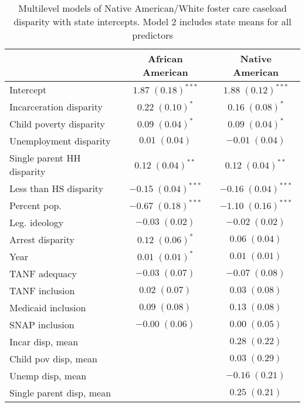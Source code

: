 
\begin{table}
\caption{Multilevel models of Native American/White foster care caseload disparity with state intercepts. Model 2 includes state means for all predictors }
\begin{center}
\begin{tabular}{l c c }
\hline
 & African American & Native American \\
\hline
Intercept                  & $1.87 \; (0.18)^{***}$  & $1.88 \; (0.12)^{***}$  \\
Incarceration disparity    & $0.22 \; (0.10)^{*}$    & $0.16 \; (0.08)^{*}$    \\
Child poverty disparity    & $0.09 \; (0.04)^{*}$    & $0.09 \; (0.04)^{*}$    \\
Unemployment disparity     & $0.01 \; (0.04)$        & $-0.01 \; (0.04)$       \\
Single parent HH disparity & $0.12 \; (0.04)^{**}$   & $0.12 \; (0.04)^{**}$   \\
Less than HS disparity     & $-0.15 \; (0.04)^{***}$ & $-0.16 \; (0.04)^{***}$ \\
Percent pop.               & $-0.67 \; (0.18)^{***}$ & $-1.10 \; (0.16)^{***}$ \\
Leg. ideology              & $-0.03 \; (0.02)$       & $-0.02 \; (0.02)$       \\
Arrest disparity           & $0.12 \; (0.06)^{*}$    & $0.06 \; (0.04)$        \\
Year                       & $0.01 \; (0.01)^{*}$    & $0.01 \; (0.01)$        \\
TANF adequacy              & $-0.03 \; (0.07)$       & $-0.07 \; (0.08)$       \\
TANF inclusion             & $0.02 \; (0.07)$        & $0.03 \; (0.08)$        \\
Medicaid inclusion         & $0.09 \; (0.08)$        & $0.13 \; (0.08)$        \\
SNAP inclusion             & $-0.00 \; (0.06)$       & $0.00 \; (0.05)$        \\
Incar disp, mean           &                         & $0.28 \; (0.22)$        \\
Child pov disp, mean       &                         & $0.03 \; (0.29)$        \\
Unemp disp, mean           &                         & $-0.16 \; (0.21)$       \\
Single parent disp, mean   &                         & $0.25 \; (0.21)$        \\

\end{tabular}
\end{center}
\end{table}
